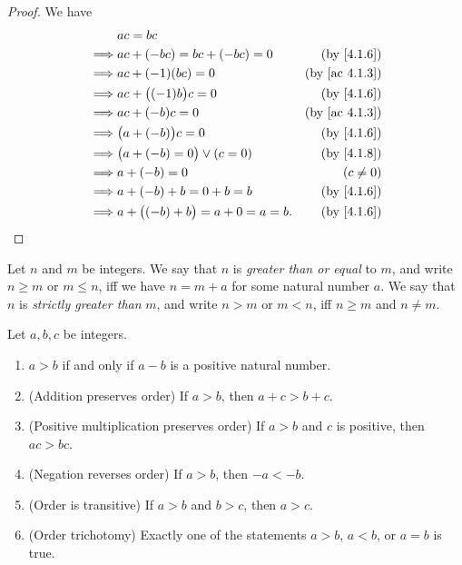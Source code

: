 \begin{proof}
  We have
  \begin{align*}
             & ac = bc                                                               \\
    \implies & ac + (-bc) = bc + (-bc) = 0             & \text{(by \cref{4.1.6})}    \\
    \implies & ac + (-1)(bc) = 0                       & \text{(by \cref{ac 4.1.3})} \\
    \implies & ac + \big((-1)b\big)c = 0               & \text{(by \cref{4.1.6})}    \\
    \implies & ac + (-b)c = 0                          & \text{(by \cref{ac 4.1.3})} \\
    \implies & \big(a + (-b)\big)c = 0                 & \text{(by \cref{4.1.6})}    \\
    \implies & \big(a + (-b) = 0\big) \lor (c = 0)     & \text{(by \cref{4.1.8})}    \\
    \implies & a + (-b) = 0                            & (c \neq 0)                  \\
    \implies & a + (-b) + b = 0 + b = b                & \text{(by \cref{4.1.6})}    \\
    \implies & a + \big((-b) + b\big) = a + 0 = a = b. & \text{(by \cref{4.1.6})}
  \end{align*}
\end{proof}

\begin{definition}\label{4.1.10}
  Let \(n\) and \(m\) be integers.
  We say that \(n\) is \emph{greater than or equal} to \(m\), and write \(n \geq m\) or \(m \leq n\), iff we have \(n = m + a\) for some natural number \(a\).
  We say that \(n\) is \emph{strictly greater than} \(m\), and write \(n > m\) or \(m < n\), iff \(n \geq m\) and \(n \neq m\).
\end{definition}

\begin{lemma}\label{4.1.11}
  Let \(a, b, c\) be integers.
  \begin{enumerate}
    \item \(a > b\) if and only if \(a - b\) is a positive natural number.
    \item (Addition preserves order) If \(a > b\), then \(a + c > b + c\).
    \item (Positive multiplication preserves order) If \(a > b\) and \(c\) is positive, then \(ac > bc\).
    \item (Negation reverses order) If \(a > b\), then \(-a < -b\).
    \item (Order is transitive) If \(a > b\) and \(b > c\), then \(a > c\).
    \item (Order trichotomy) Exactly one of the statements \(a > b\), \(a < b\), or \(a = b\) is true.
  \end{enumerate}
\end{lemma}

